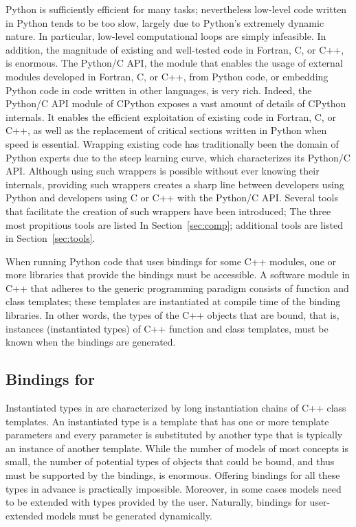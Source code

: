 Python is sufficiently efficient for many tasks; nevertheless low-level code written in Python tends to be too slow, largely due to Python's extremely dynamic nature. In particular, low-level computational loops are simply infeasible. In addition, the magnitude of existing and well-tested code in Fortran, C, or C++, is enormous. The Python/C API, the module that enables the usage of external modules developed in Fortran, C, or C++, from Python code, or embedding Python code in code written in other languages, is very rich.  Indeed, the Python/C API module of CPython exposes a vast amount of details of CPython internals. It enables the efficient exploitation of existing code in Fortran, C, or C++, 
as well as the replacement of critical sections written in Python when speed is essential.
Wrapping existing code has traditionally been the domain of Python experts due to the steep learning curve, which characterizes its Python/C API. Although using such wrappers is possible without ever knowing their internals, providing such wrappers creates a sharp line between developers using Python and developers using C or C++ with the Python/C API. Several tools that facilitate the creation of such wrappers have been introduced; The three most propitious tools are listed In Section~\ref{sec:comp}; additional tools are listed in Section~\ref{sec:tools}.

When running Python code that uses bindings for some C++ modules, one or more libraries that provide the bindings must be accessible.  A software module in C++ that adheres to the generic programming paradigm consists of function and class templates; these templates are instantiated at compile time of the binding libraries. In other words, the types of the C++ objects that are bound, that is, instances (instantiated types) of C++ function and class templates, must be known when the bindings are generated.

\subsection{Bindings for \cgal}
\label{ssec:intro:cgal}
Instantiated types in \cgal{} are characterized by long instantiation chains of C++ class templates. An instantiated type is a template that has one or more template parameters and every parameter is substituted by another type that is typically an instance of another template. While the number of models of most concepts is small, the number of potential types of objects that could be bound, and thus must be supported by the bindings, is enormous. Offering bindings for all these types in advance is practically impossible. Moreover, in some cases models need to be extended with types provided by the user. Naturally, bindings for user-extended models must be generated dynamically.

